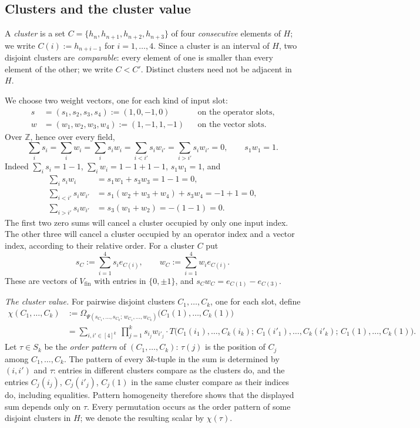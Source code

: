 \documentclass[11pt]{amsart}
\theoremstyle{definition}
\theoremstyle{remark}
\numberwithin{equation}{section}
\newcommand{\Z}{\mathbb Z}
\theoremstyle{plain}
\theoremstyle{definition}
\theoremstyle{plain}
\begin{document}
\subsection{Clusters and the cluster value}
A \emph{cluster} is a set $C=\{h_n,h_{n+1},h_{n+2},h_{n+3}\}$ of four
\emph{consecutive} elements of $H$; we write $C(i):=h_{n+i-1}$ for $i=1,\dots,4$. Since a cluster is an interval of
$H$, two disjoint clusters are \emph{comparable}: every element of one is smaller than every element of the other; we
write $C<C'$. Distinct clusters need not be adjacent in $H$.

We choose two weight vectors, one for each kind of input slot:
\begin{align*}
s&=(s_1,s_2,s_3,s_4):=(1,0,-1,0)&&\text{on the operator slots},\\
w&=(w_1,w_2,w_3,w_4):=(1,-1,1,-1)&&\text{on the vector slots}.
\end{align*}
Over $\Z$, hence over every field,
\begin{equation*}\tag{W}\label{eq:W}
\sum_is_i=\sum_iw_i=\sum_is_iw_i=\sum_{i<i'}s_iw_{i'}=\sum_{i>i'}s_iw_{i'}=0,\qquad s_1w_1=1.
\end{equation*}
Indeed $\sum_is_i=1-1$, $\sum_iw_i=1-1+1-1$, $s_1w_1=1$, and
\begin{align*}
\sum_is_iw_i&=s_1w_1+s_3w_3=1-1=0,\\
\sum_{i<i'}s_iw_{i'}&=s_1(w_2+w_3+w_4)+s_3w_4=-1+1=0,\\
\sum_{i>i'}s_iw_{i'}&=s_3(w_1+w_2)=-(1-1)=0 .
\end{align*}
The first two zero sums will cancel a cluster occupied by only one input index. The other three will cancel a
cluster occupied by an operator index and a vector index, according to their relative order. For a cluster $C$ put
\[
s_C:=\sum_{i=1}^4s_ie_{C(i)},\qquad w_C:=\sum_{i=1}^4w_ie_{C(i)} .
\]
These are vectors of $V_{\mathrm{fin}}$ with entries in $\{0,\pm1\}$, and $s_Cw_C=e_{C(1)}-e_{C(3)}$.

\emph{The cluster value.} For pairwise disjoint clusters $C_1,\dots,C_k$, one for each slot, define
\begin{align*}
\chi(C_1,\dots,C_k)&:=\Omega_{\Psi(s_{C_1},\dots,s_{C_k};\,w_{C_1},\dots,w_{C_k})}\bigl(C_1(1),\dots,C_k(1)\bigr)\\
&=\sum_{i,i'\in[4]^k}\ \prod_{j=1}^ks_{i_j}w_{i'_j}\cdot
T\bigl(C_1(i_1),\dots,C_k(i_k);\,C_1(i'_1),\dots,C_k(i'_k);\,C_1(1),\dots,C_k(1)\bigr).
\end{align*}
Let $\tau\in S_k$ be the \emph{order pattern} of $(C_1,\dots,C_k)$: $\tau(j)$ is the position of $C_j$ among
$C_1,\dots,C_k$. The pattern of every $3k$\nobreakdash-tuple in the sum is determined by $(i,i')$ and $\tau$: entries in different
clusters compare as the clusters do, and the entries $C_j(i_j)$, $C_j(i'_j)$, $C_j(1)$ in the same cluster compare as
their indices do, including equalities. Pattern homogeneity therefore shows that the displayed sum depends only
on $\tau$. Every permutation occurs as the order pattern of some disjoint clusters in $H$; we denote the resulting
scalar by $\chi(\tau)$.
\end{document}
